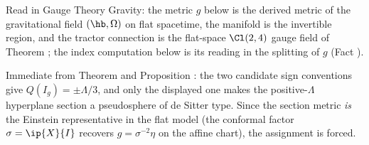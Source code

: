 Read in Gauge Theory Gravity: the metric $g$ below is the derived metric of the gravitational field $(\hb, \Omega)$ on flat spacetime, the manifold is the invertible region, and the tractor connection is the flat-space $\Cl(2,4)$ gauge field of Theorem ; the index computation below is its reading in the splitting of $g$ (Fact ).

Immediate from Theorem  and Proposition : the two candidate sign conventions give $Q(I_g) = \pm\Lambda/3$, and only the displayed one makes the positive-$\Lambda$ hyperplane section a pseudosphere of de Sitter type. Since the section metric \emph{is} the Einstein representative in the flat model (the conformal factor $\sigma = \ip{X}{I}$ recovers $g = \sigma^{-2}\eta$ on the affine chart), the assignment is forced.
